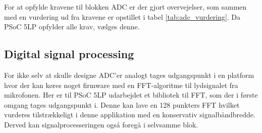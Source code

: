 {For at opfylde kravene til blokken ADC er der gjort overvejelser, som sammen med en vurdering ud fra kravene er opstillet i tabel \ref{tab:adc_vurdering}. Da PSoC 5LP opfylder alle krav, vælges denne. 

\subsection{Digital signal processing}
For ikke selv at skulle designe ADC'er analogt tages udgangspunkt i en platform hvor der kan køres noget firmware med en FFT-algoritme til lydsignalet fra mikrofonen. Her er til PSoC 5LP udarbejdet et bibliotek til FFT\tbr, som der i første omgang tages udgangspunkt i. Denne kan lave en 128 punkters FFT hvilket vurderes tilstrækkeligt i denne applikation med en konservativ signalbåndbredde. Derved kan signalprocesseringen også foregå i selvsamme blok. 
}























